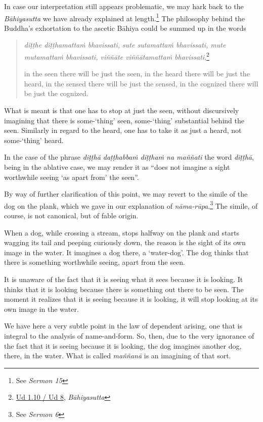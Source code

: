 In case our interpretation still appears problematic, we may hark back to the \emph{Bāhiyasutta} we have already explained at length.\footnote{See \emph{Sermon 15}} The philosophy behind the Buddha's exhortation to the ascetic Bāhiya could be summed up in the words

\begin{quote}
\emph{diṭṭhe diṭṭhamattaṁ bhavissati, sute sutamattaṁ bhavissati, mute mutamattaṁ bhavissati, viññāte viññātamattaṁ bhavissati},\footnote{\href{https://suttacentral.net/ud1.10/pli/ms}{Ud 1.10 / Ud 8}, \emph{Bāhiyasutta}}

in the seen there will be just the seen, in the heard there will be just the heard, in the sensed there will be just the sensed, in the cognized there will be just the cognized.
\end{quote}

What is meant is that one has to stop at just the seen, without discursively imagining that there is some-`thing' seen, some-`thing' substantial behind the seen. Similarly in regard to the heard, one has to take it as just a heard, not some-`thing' heard.

In the case of the phrase \emph{diṭṭhā daṭṭhabbaṁ diṭṭhaṁ na maññati} the word \emph{diṭṭhā}, being in the ablative case, we may render it as ``does not imagine a sight worthwhile seeing `as apart from' the seen''.

By way of further clarification of this point, we may revert to the simile of the dog on the plank, which we gave in our explanation of \emph{nāma-rūpa}.\footnote{See \emph{Sermon 6}} The simile, of course, is not canonical, but of fable origin.

When a dog, while crossing a stream, stops halfway on the plank and starts wagging its tail and peeping curiously down, the reason is the sight of its own image in the water. It imagines a dog there, a `water-dog'. The dog thinks that there is something worthwhile seeing, apart from the seen.

It is unaware of the fact that it is seeing what it sees because it is looking. It thinks that it is looking because there is something out there to be seen. The moment it realizes that it is seeing because it is looking, it will stop looking at its own image in the water.

We have here a very subtle point in the law of dependent arising, one that is integral to the analysis of name-and-form. So, then, due to the very ignorance of the fact that it is seeing because it is looking, the dog imagines another dog, there, in the water. What is called \emph{maññanā} is an imagining of that sort.

